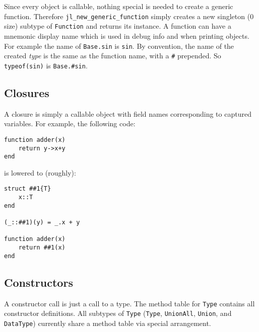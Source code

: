 Since every object is callable, nothing special is needed to create a generic function. Therefore \texttt{jl\_new\_generic\_function} simply creates a new singleton (0 size) subtype of \texttt{Function} and returns its instance. A function can have a mnemonic {\textquotedbl}display name{\textquotedbl} which is used in debug info and when printing objects. For example the name of \texttt{Base.sin} is \texttt{sin}. By convention, the name of the created \emph{type} is the same as the function name, with a \texttt{\#} prepended. So \texttt{typeof(sin)} is \texttt{Base.\#sin}.



\hypertarget{5087486620251640638}{}


\subsection{Closures}



A closure is simply a callable object with field names corresponding to captured variables. For example, the following code:




\begin{verbatim}
function adder(x)
    return y->x+y
end
\end{verbatim}



is lowered to (roughly):




\begin{verbatim}
struct ##1{T}
    x::T
end

(_::##1)(y) = _.x + y

function adder(x)
    return ##1(x)
end
\end{verbatim}



\hypertarget{3597362352537600414}{}


\subsection{Constructors}



A constructor call is just a call to a type. The method table for \texttt{Type} contains all constructor definitions. All subtypes of \texttt{Type} (\texttt{Type}, \texttt{UnionAll}, \texttt{Union}, and \texttt{DataType}) currently share a method table via special arrangement.



